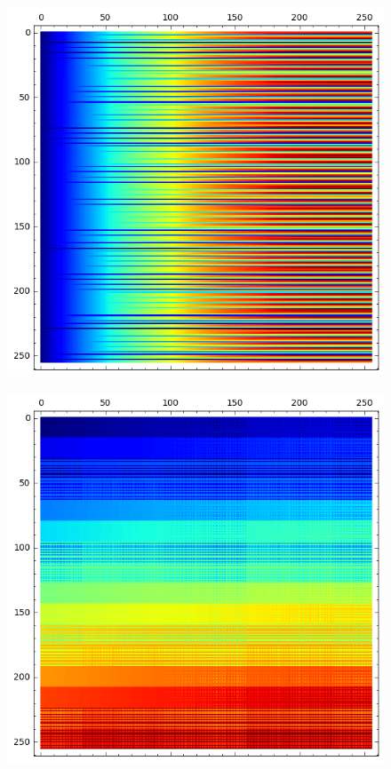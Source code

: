 \documentclass[12pt,a4paper]{article}
\begin{document}
\begin{figure}[!hb]
\centering
\begin{minipage}{.48\textwidth}
  \centering
\includegraphics[width=.9\linewidth]{../matrix_plot/cast128_4_27_bent_cayley_graph_index_matrix.png}
  \label{fig:cast128_4_27_bent_cayley_graph_index_matrix}
\end{minipage}%
\begin{minipage}{.48\textwidth}
  \centering
\includegraphics[width=.9\linewidth]{../matrix_plot/cast128_5_16_bent_cayley_graph_index_matrix.png}

\end{minipage}
\end{figure}
\end{document}
